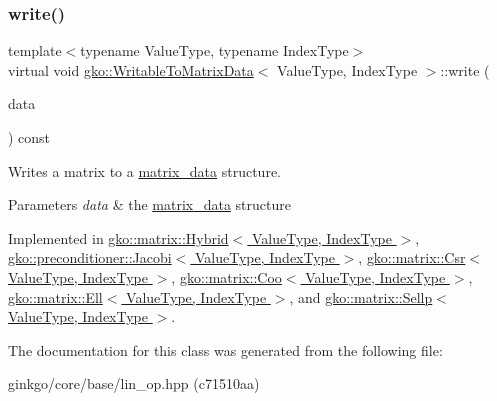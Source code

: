 \subsubsection{\texorpdfstring{write()}{write()}}
{\footnotesize\ttfamily template$<$typename Value\+Type, typename Index\+Type$>$ \\
virtual void \hyperlink{classgko_1_1WritableToMatrixData}{gko\+::\+Writable\+To\+Matrix\+Data}$<$ Value\+Type, Index\+Type $>$\+::write (\begin{DoxyParamCaption}\item[{\hyperlink{structgko_1_1matrix__data}{matrix\+\_\+data}$<$ Value\+Type, Index\+Type $>$ \&}]{data }\end{DoxyParamCaption}) const\hspace{0.3cm}{\ttfamily [pure virtual]}}



Writes a matrix to a \hyperlink{structgko_1_1matrix__data}{matrix\+\_\+data} structure. 


\begin{DoxyParams}{Parameters}
{\em data} & the \hyperlink{structgko_1_1matrix__data}{matrix\+\_\+data} structure \\
\hline
\end{DoxyParams}


Implemented in \hyperlink{classgko_1_1matrix_1_1Hybrid_a626c07541641bcdfd9a7f61322a89cbe}{gko\+::matrix\+::\+Hybrid$<$ Value\+Type, Index\+Type $>$}, \hyperlink{classgko_1_1preconditioner_1_1Jacobi_ac52bb1c70d4882876da1ee21c3b124ee}{gko\+::preconditioner\+::\+Jacobi$<$ Value\+Type, Index\+Type $>$}, \hyperlink{classgko_1_1matrix_1_1Csr_a205fc391f4cf4f7718a55b0a61f62bc9}{gko\+::matrix\+::\+Csr$<$ Value\+Type, Index\+Type $>$}, \hyperlink{classgko_1_1matrix_1_1Coo_ae193466ca1a4a3c7d1383ddc5a2701ab}{gko\+::matrix\+::\+Coo$<$ Value\+Type, Index\+Type $>$}, \hyperlink{classgko_1_1matrix_1_1Ell_afa9148a16a9255003055d8e9156ee941}{gko\+::matrix\+::\+Ell$<$ Value\+Type, Index\+Type $>$}, and \hyperlink{classgko_1_1matrix_1_1Sellp_aae2355a2866318b154d017b1c51f30a5}{gko\+::matrix\+::\+Sellp$<$ Value\+Type, Index\+Type $>$}.



The documentation for this class was generated from the following file\+:\begin{DoxyCompactItemize}
\item 
ginkgo/core/base/lin\+\_\+op.\+hpp (c71510aa)\end{DoxyCompactItemize}
